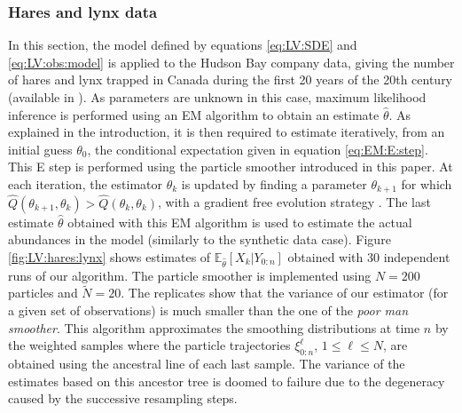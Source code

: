 \documentclass{article}
\def\pE{\mathbb{E}}
\newcommand{\epart}[2]{\ensuremath{\xi_{#1}^{#2}}}
\begin{document}
\subsubsection*{Hares and lynx data}

In this section, the model defined by equations \eqref{eq:LV:SDE} and \eqref{eq:LV:obs:model} is applied to the Hudson Bay company data, giving the number of hares and lynx trapped in Canada during the first 20 years of the 20th century (available in \cite{odum1971fundamentals}). As parameters are unknown in this case, maximum likelihood inference is performed using an EM \cite{dempster1977maximum} algorithm to obtain an estimate $\hat{\theta}$.
As explained in the introduction, it is then required to estimate iteratively, from an initial guess $\theta_0$, the conditional expectation given in equation \eqref{eq:EM:E:step}.
This E step is performed using the particle smoother introduced in this paper.
At each iteration, the estimator $\theta_k$ is updated by finding a parameter $\theta_{k+1}$ for which $\hat Q(\theta_{k+1},\theta_k) >  \hat Q(\theta_k,\theta_k)$, with  a gradient free evolution strategy \cite{hansen2006cma}. The last estimate $\hat{\theta}$ obtained with this EM algorithm  is used to  estimate the actual abundances in the model (similarly to the synthetic data case). Figure \ref{fig:LV:hares:lynx} shows  estimates of $\pE_{\hat{\theta}}\left[ X_k \vert Y_{0:n}\right]$ obtained with 30 independent runs of our algorithm. 
The particle smoother is implemented using $N = 200$ particles and $\tilde{N}=20$. 
The replicates show that the variance of our estimator (for a given set of observations) is much smaller than the one of the {\em poor man smoother}. This algorithm approximates the smoothing distributions at time $n$ by the weighted samples  where the particle trajectories $\epart{0:n}{\ell}$, $1\leqslant \ell \leqslant N$,  are obtained using the ancestral line of each last sample. The variance of the estimates based on this ancestor tree is doomed to failure due to the degeneracy caused by the successive resampling steps.
\end{document}
